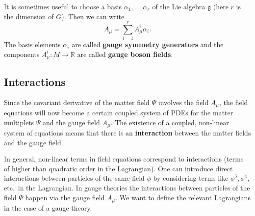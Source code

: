 \documentclass[12pt]{amsart}
\theoremstyle{definition}
\theoremstyle{remark}
\numberwithin{equation}{section}
\begin{document}
It is sometimes useful to choose a basis $\alpha_1,\ldots,\alpha_r$ of the Lie algebra $\mathfrak{g}$ (here $r$ is the dimension of $G$). Then we can write
\begin{equation*}
A_\mu=\sum_{i=1}^rA_\mu^i\alpha_i.
\end{equation*} 
The basis elements $\alpha_i$ are called {\bf gauge symmetry generators} and the components $A_\mu^i\colon M\rightarrow\mathbb{R}$ are called {\bf gauge boson fields}.

\subsection{Interactions}
Since the covariant derivative of the matter field $\Psi$ involves the field $A_\mu$, the field equations will now become a certain coupled system of PDEs for the matter multiplets $\Psi$ and the gauge field $A_\mu$. The existence of a coupled, non-linear system of equations means that there is an {\bf interaction} between the matter fields and the gauge field. 

In general, non-linear terms in field equations correspond to interactions (terms of higher than quadratic order in the Lagrangian). One can introduce direct interactions between particles of the same field $\phi$ by considering terms like $\phi^3, \phi^4$, etc.~in the Lagrangian. In gauge theories the interactions between particles of the field $\Psi$ happen via the gauge field $A_\mu$. We want to define the relevant Lagrangians in the case of a gauge theory. 
\end{document}
